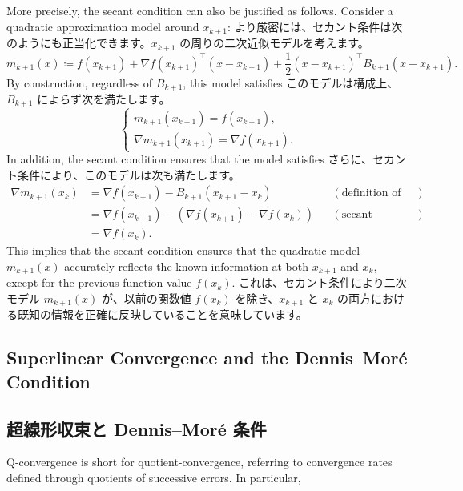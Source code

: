 \documentclass[0_main]{subfiles}
\begin{document}
\ifEn
    More precisely, the secant condition can also be justified as follows. Consider a quadratic approximation model around $x_{k+1}$:
\else
    より厳密には、セカント条件は次のようにも正当化できます。$x_{k+1}$ の周りの二次近似モデルを考えます。
\fi
\begin{equation*}
    m_{k+1}(x) \coloneqq f(x_{k+1}) + \nabla f(x_{k+1})^\top (x - x_{k+1}) + \frac{1}{2} (x - x_{k+1})^\top B_{k+1} (x - x_{k+1}).
\end{equation*}
\ifEn
    By construction, regardless of $B_{k+1}$, this model satisfies
\else
    このモデルは構成上、$B_{k+1}$ によらず次を満たします。
\fi
\begin{equation*}
    \begin{cases}
        m_{k+1}(x_{k+1}) = f(x_{k+1}), \\
        \nabla m_{k+1}(x_{k+1}) = \nabla f(x_{k+1}).
    \end{cases}
\end{equation*}
\ifEn
    In addition, the secant condition ensures that the model satisfies
\else
    さらに、セカント条件により、このモデルは次も満たします。
\fi
\begin{align*}
    \nabla m_{k+1}(x_k) & = \nabla f(x_{k+1}) - B_{k+1} (x_{k+1} - x_k)             &  & (\text{definition of the model}) \\
                        & = \nabla f(x_{k+1}) - (\nabla f(x_{k+1}) - \nabla f(x_k)) &  & (\text{secant condition})        \\
                        & = \nabla f(x_k).
\end{align*}
\ifEn
    This implies that the secant condition ensures that the quadratic model $m_{k+1}(x)$ accurately reflects the known information at both $x_{k+1}$ and $x_k$, except for the previous function value $f(x_k)$.
\else
    これは、セカント条件により二次モデル $m_{k+1}(x)$ が、以前の関数値 $f(x_k)$ を除き、$x_{k+1}$ と $x_k$ の両方における既知の情報を正確に反映していることを意味しています。
\fi

\ifEn
    \subsection{Superlinear Convergence and the Dennis--Mor{\'e} Condition}
\else
    \subsection{超線形収束と Dennis--Mor{\'e} 条件}
\fi

\ifEn
    Q-convergence is short for quotient-convergence, referring to convergence rates defined through quotients of successive errors. In particular,
\end{document}
